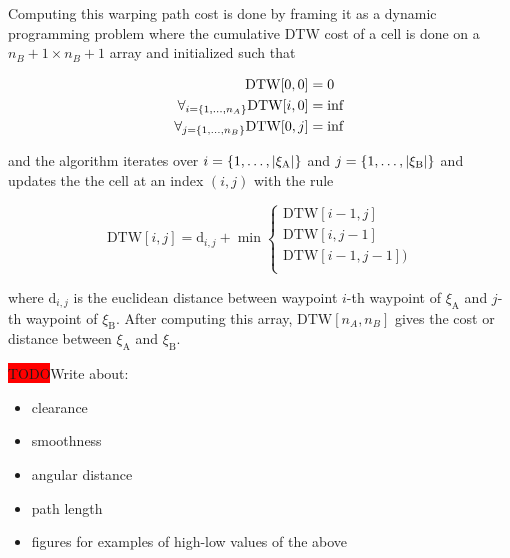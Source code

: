\documentclass[letterpaper, 10 pt, conference]{ieeeconf}  %
\newcommand{\todo}{\colorbox{red}{TODO}}
\newcommand{\tj}[1]{\ensuremath{\xi_\text{#1}}}
\begin{document}
Computing this warping path cost is done by framing it as a dynamic programming problem where the cumulative DTW cost of a cell is done on a $n_B+1 \times n_B+1$ array and initialized such that

\begin{equation}
\begin{aligned}
\text{DTW}[0,0] &= 0 \\
\forall_{i=\{1,\mathellipsis,n_A\}} \text{DTW}[i,0] &= \inf\\
\forall_{j=\{1,\mathellipsis,n_B\}} \text{DTW}[0,j] &= \inf\\
\end{aligned}
\end{equation}

and the algorithm iterates over $i=\{1,\mathellipsis,|\tj{A}|\}$ and $j=\{1,\mathellipsis,|\tj{B}|\}$ and updates the the cell at an index $(i,j)$ with the rule

\begin{equation}
\text{DTW}[i,j] = \text{d}_{i,j} + \min 
  \begin{cases}
    \text{DTW}[i-1,j] \\
    \text{DTW}[i,j-1] \\
    \text{DTW}[i-1,j-1] ) \\
  \end{cases}
\end{equation}

where $\text{d}_{i,j}$ is the euclidean distance between waypoint $i$-th waypoint of \tj{A} and $j$-th waypoint of \tj{B}. After computing this array, $\text{DTW}[n_A, n_B]$ gives the cost or distance between \tj{A} and \tj{B}.

\todo Write about:
\begin{itemize}
\item clearance
\item smoothness
\item angular distance
\item path length
\item figures for examples of high-low values of the above
\end{itemize}

\addtolength{\textheight}{-12cm}   %
\end{document}

